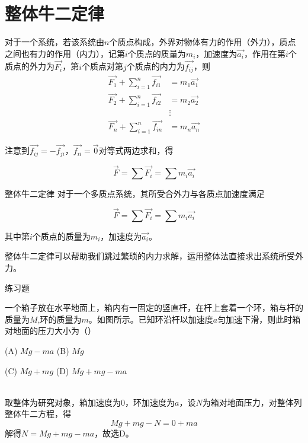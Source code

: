 \section{整体牛二定律}

对于一个系统，若该系统由$n$个质点构成，外界对物体有力的作用（外力），质点之间也有力的作用（内力），记第$i$个质点的质量为$m_i$，加速度为$\vec{a_i}$，作用在第$i$个质点的外力为$\vec{F_i}$，第$i$个质点对第$j$个质点的内力为$\vec{f_{ij}}$，则
\begin{subequations}
\begin{align*}
\vec{F_1} + \sum_{i=1}^{n} \vec{f_{i1}} &= m_1 \vec{a_1} \\
\vec{F_2} + \sum_{i=1}^{n} \vec{f_{i2}} &= m_2 \vec{a_2} \\
&\vdots \\
\vec{F_n} + \sum_{i=1}^{n} \vec{f_{in}} &= m_n \vec{a_n} 
\end{align*}
\end{subequations}

注意到$\vec{f_{ij}} = - \vec{f_{ji}}$，$\vec{f_{ii}}=\vec{0}$对等式两边求和，得

$$\vec{F} = \sum \vec{F_i} = \sum m_i \vec{a_i}$$

\begin{theo}{整体牛二定律}{}
对于一个多质点系统，其所受合外力与各质点加速度满足

$$\vec{F} = \sum \vec{F_i} = \sum m_i \vec{a_i}$$

其中第$i$个质点的质量为$m_i$，加速度为$\vec{a_i}$。
\end{theo}

整体牛二定律可以帮助我们跳过繁琐的内力求解，运用整体法直接求出系统所受外力。

\begin{ep}{练习题}{}
\begin{minipage}[b]{0.6\linewidth}
一个箱子放在水平地面上，箱内有一固定的竖直杆，在杆上套着一个环，箱与杆的质量为$M$,环的质量为$m$。如图所示。已知环沿杆以加速度$a$匀加速下滑，则此时箱对地面的压力大小为（）

(A) $Mg-ma$ \quad (B) $Mg$

(C) $Mg+mg$ \quad (D) $Mg+mg-ma$
\end{minipage}
\hfill
\begin{minipage}[b]{0.3\linewidth}

\end{minipage}
~\\

取整体为研究对象，箱加速度为$0$，环加速度为$a$，设$N$为箱对地面压力，对整体列整体牛二方程，得
$$Mg+mg-N=0 + ma$$
解得$N=Mg+mg-ma$，故选D。
\end{ep}

